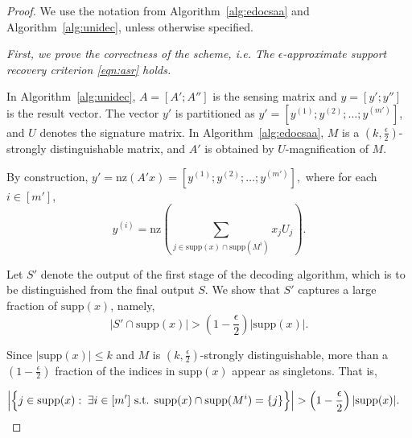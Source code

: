 \documentclass{article}
\newcommand{\supp}{\mathrm{supp}}
\newcommand{\nz}{\mathrm{nz}}
\begin{document}
\begin{proof}
We use the notation from Algorithm~\ref{alg:edocsaa} and Algorithm~\ref{alg:unidec}, unless otherwise specified.

\emph{First, we prove the correctness of the scheme, i.e. The $\epsilon$-approximate support recovery criterion \eqref{eqn:asr} holds.}

In Algorithm~\ref{alg:unidec}, $A = [A'; A'']$ is the sensing matrix and $y = [y'; y'']$ is the result vector. The vector $y'$ is partitioned as $y' = [y^{(1)}; y^{(2)}; \dots; y^{(m')}]$, and $U$ denotes the signature matrix. In Algorithm~\ref{alg:edocsaa}, $M$ is a $(k,\frac{\epsilon}{2})$-strongly distinguishable matrix, and $A'$ is obtained by $U$-magnification of $M$.

By construction,
\(
y' = \nz(A'x) = [y^{(1)}; y^{(2)}; \dots; y^{(m')}],
\)
where for each $i \in [m']$,
\[
y^{(i)} = \nz\left(\sum_{j \in \supp(x)\cap \supp(M^i)} x_jU_j\right).
\]

Let $S'$ denote the output of the first stage of the decoding algorithm, which is to be distinguished from the final output $S$. We show that $S'$ captures a large fraction of $\supp(x)$, namely,
\begin{equation}\label{eqn1}
    |S' \cap \supp(x)| > \left(1 - \frac{\epsilon}{2}\right)|\supp(x)|.
\end{equation}

Since $|\supp(x)| \leq k$ and $M$ is $(k,\frac{\epsilon}{2})$-strongly distinguishable, more than a $(1 - \frac{\epsilon}{2})$ fraction of the indices in $\supp(x)$ appear as singletons. That is,


\begin{equation}\label{eqn2}
\begin{aligned}
&\Bigl| \Bigl\{ j \in \supp(x) :\; 
\exists i \in [m'] \text{ s.t. }
\supp(x) \cap \supp(M^i) = \{j\} \Bigr\} \Bigr| > \left(1 - \frac{\epsilon}{2}\right) |\supp(x)|.
\end{aligned}
\end{equation}


\end{proof}
\end{document}
